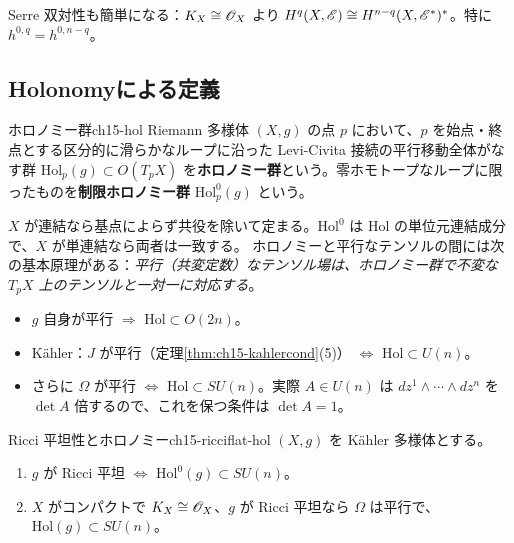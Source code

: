 Serre 双対性も簡単になる：$K_X\cong\mathscr{O}_X$ より $H^q(X,\mathscr{E})\cong H^{n-q}(X,\mathscr{E}^*)^*$。特に $h^{0,q} = h^{0,n-q}$。

\subsection{Holonomyによる定義}

\begin{mydef}{ホロノミー群}{ch15-hol}
Riemann 多様体 $(X,g)$ の点 $p$ において、$p$ を始点・終点とする区分的に滑らかなループに沿った Levi-Civita 接続の平行移動全体がなす群
$\mathrm{Hol}_p(g)\subset O(T_pX)$ を\textbf{ホロノミー群}という。零ホモトープなループに限ったものを\textbf{制限ホロノミー群} $\mathrm{Hol}^0_p(g)$ という。
\end{mydef}

$X$ が連結なら基点によらず共役を除いて定まる。$\mathrm{Hol}^0$ は $\mathrm{Hol}$ の単位元連結成分で、$X$ が単連結なら両者は一致する。
ホロノミーと平行なテンソルの間には次の基本原理がある：\emph{平行（共変定数）なテンソル場は、ホロノミー群で不変な $T_pX$ 上のテンソルと一対一に対応する}。
\begin{itemize}
\item $g$ 自身が平行 $\Rightarrow$ $\mathrm{Hol}\subset O(2n)$。
\item K\"ahler：$J$ が平行（定理\ref{thm:ch15-kahlercond}(5)） $\Leftrightarrow$ $\mathrm{Hol}\subset U(n)$。
\item さらに $\Omega$ が平行 $\Leftrightarrow$ $\mathrm{Hol}\subset SU(n)$。実際 $A\in U(n)$ は $dz^1\wedge\cdots\wedge dz^n$ を $\det A$ 倍するので、これを保つ条件は $\det A = 1$。
\end{itemize}

\begin{mythm}{Ricci 平坦性とホロノミー}{ch15-ricciflat-hol}
$(X,g)$ を K\"ahler 多様体とする。
\begin{enumerate}
\item $g$ が Ricci 平坦 $\Leftrightarrow$ $\mathrm{Hol}^0(g)\subset SU(n)$。
\item $X$ がコンパクトで $K_X\cong\mathscr{O}_X$、$g$ が Ricci 平坦なら $\Omega$ は平行で、$\mathrm{Hol}(g)\subset SU(n)$。
\end{enumerate}
\end{mythm}

